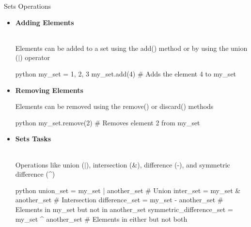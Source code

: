 \documentclass[
	11pt, 
]{beamer}
\begin{document}
\begin{frame}[fragile]{Sets Operations}
\scriptsize
\begin{itemize}
    \item \textbf{Adding Elements} \\ \\ \smallskip

    Elements can be added to a set using the add() method or by using the union ($\vert$) operator
    
\begin{mintedbox}{python} 
my_set = {1, 2, 3}
my_set.add(4) # Adds the element 4 to my_set
\end{mintedbox}

    \item \textbf{Removing Elements}
    
    Elements can be removed using the remove() or discard() methods
    
    \begin{mintedbox}{python}
my_set.remove(2) # Removes element 2 from my_set
    \end{mintedbox}

    \item \textbf{Sets Tasks} \\ \\ \smallskip

     Operations like union ($\vert$), intersection (\&), difference (-), and symmetric difference (\^{})
     
\begin{mintedbox}{python}
union_set = my_set | another_set  # Union 
inter_set = my_set & another_set  # Intersection
difference_set = my_set - another_set  
# Elements in my_set but not in another_set
symmetric_difference_set = my_set ^ another_set  
# Elements in either but not both
\end{mintedbox}

\end{itemize}
\end{frame}



\end{document}
